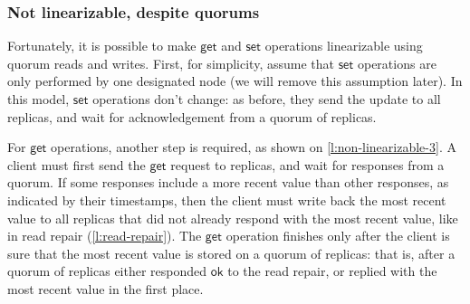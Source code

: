 \begin{frame}
    \label{s:non-linearizable-2}
    \frametitle{Not linearizable, despite quorums}
\end{frame}
\label{l:non-linearizable-2}

Fortunately, it is possible to make $\mathsf{get}$ and $\mathsf{set}$ operations linearizable using quorum reads and writes.
First, for simplicity, assume that $\mathsf{set}$ operations are only performed by one designated node (we will remove this assumption later).
In this model, $\mathsf{set}$ operations don't change: as before, they send the update to all replicas, and wait for acknowledgement from a quorum of replicas.

For $\mathsf{get}$ operations, another step is required, as shown on \autoref{l:non-linearizable-3}.
A client must first send the $\mathsf{get}$ request to replicas, and wait for responses from a quorum.
If some responses include a more recent value than other responses, as indicated by their timestamps, then the client must write back the most recent value to all replicas that did not already respond with the most recent value, like in read repair (\autoref{l:read-repair}).
The $\mathsf{get}$ operation finishes only after the client is sure that the most recent value is stored on a quorum of replicas: that is, after a quorum of replicas either responded $\mathsf{ok}$ to the read repair, or replied with the most recent value in the first place.

